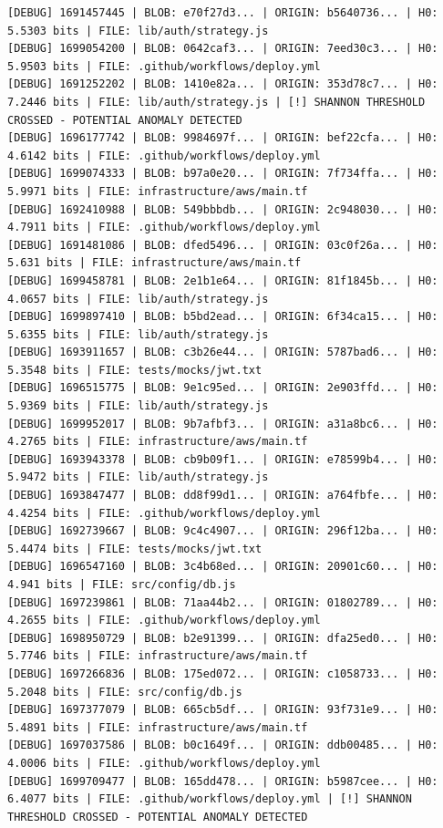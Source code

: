 \documentclass[12pt, a4paper, oneside]{report}
\begin{document}
\begin{lstlisting}[basicstyle=\tiny\ttfamily]
[DEBUG] 1691457445 | BLOB: e70f27d3... | ORIGIN: b5640736... | H0: 5.5303 bits | FILE: lib/auth/strategy.js
[DEBUG] 1699054200 | BLOB: 0642caf3... | ORIGIN: 7eed30c3... | H0: 5.9503 bits | FILE: .github/workflows/deploy.yml
[DEBUG] 1691252202 | BLOB: 1410e82a... | ORIGIN: 353d78c7... | H0: 7.2446 bits | FILE: lib/auth/strategy.js | [!] SHANNON THRESHOLD CROSSED - POTENTIAL ANOMALY DETECTED
[DEBUG] 1696177742 | BLOB: 9984697f... | ORIGIN: bef22cfa... | H0: 4.6142 bits | FILE: .github/workflows/deploy.yml
[DEBUG] 1699074333 | BLOB: b97a0e20... | ORIGIN: 7f734ffa... | H0: 5.9971 bits | FILE: infrastructure/aws/main.tf
[DEBUG] 1692410988 | BLOB: 549bbbdb... | ORIGIN: 2c948030... | H0: 4.7911 bits | FILE: .github/workflows/deploy.yml
[DEBUG] 1691481086 | BLOB: dfed5496... | ORIGIN: 03c0f26a... | H0: 5.631 bits | FILE: infrastructure/aws/main.tf
[DEBUG] 1699458781 | BLOB: 2e1b1e64... | ORIGIN: 81f1845b... | H0: 4.0657 bits | FILE: lib/auth/strategy.js
[DEBUG] 1699897410 | BLOB: b5bd2ead... | ORIGIN: 6f34ca15... | H0: 5.6355 bits | FILE: lib/auth/strategy.js
[DEBUG] 1693911657 | BLOB: c3b26e44... | ORIGIN: 5787bad6... | H0: 5.3548 bits | FILE: tests/mocks/jwt.txt
[DEBUG] 1696515775 | BLOB: 9e1c95ed... | ORIGIN: 2e903ffd... | H0: 5.9369 bits | FILE: lib/auth/strategy.js
[DEBUG] 1699952017 | BLOB: 9b7afbf3... | ORIGIN: a31a8bc6... | H0: 4.2765 bits | FILE: infrastructure/aws/main.tf
[DEBUG] 1693943378 | BLOB: cb9b09f1... | ORIGIN: e78599b4... | H0: 5.9472 bits | FILE: lib/auth/strategy.js
[DEBUG] 1693847477 | BLOB: dd8f99d1... | ORIGIN: a764fbfe... | H0: 4.4254 bits | FILE: .github/workflows/deploy.yml
[DEBUG] 1692739667 | BLOB: 9c4c4907... | ORIGIN: 296f12ba... | H0: 5.4474 bits | FILE: tests/mocks/jwt.txt
[DEBUG] 1696547160 | BLOB: 3c4b68ed... | ORIGIN: 20901c60... | H0: 4.941 bits | FILE: src/config/db.js
[DEBUG] 1697239861 | BLOB: 71aa44b2... | ORIGIN: 01802789... | H0: 4.2655 bits | FILE: .github/workflows/deploy.yml
[DEBUG] 1698950729 | BLOB: b2e91399... | ORIGIN: dfa25ed0... | H0: 5.7746 bits | FILE: infrastructure/aws/main.tf
[DEBUG] 1697266836 | BLOB: 175ed072... | ORIGIN: c1058733... | H0: 5.2048 bits | FILE: src/config/db.js
[DEBUG] 1697377079 | BLOB: 665cb5df... | ORIGIN: 93f731e9... | H0: 5.4891 bits | FILE: infrastructure/aws/main.tf
[DEBUG] 1697037586 | BLOB: b0c1649f... | ORIGIN: ddb00485... | H0: 4.0006 bits | FILE: .github/workflows/deploy.yml
[DEBUG] 1699709477 | BLOB: 165dd478... | ORIGIN: b5987cee... | H0: 6.4077 bits | FILE: .github/workflows/deploy.yml | [!] SHANNON THRESHOLD CROSSED - POTENTIAL ANOMALY DETECTED

\end{lstlisting}
\end{document}
